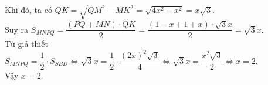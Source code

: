 \begin{ex}
{\begin{itemchoice}
\begin{center}
			\end{center}
			Khi đó, ta có $QK=\sqrt{Q{M^2}-M{K^2}}=\sqrt{4x^2-x^2}=x\sqrt  3 $.\\
			 Suy ra $S_{MNPQ}=\dfrac{\left(PQ+MN\right)\cdot QK}{2}=\dfrac{\left(1-x+1+x\right)\cdot\sqrt 3 x}{2}=\sqrt 3 x$.\\
			Từ giả thiết $S_{MNPQ}=\dfrac{1}{2}\cdot {S_{SBD}}\Leftrightarrow\sqrt  3 x=\dfrac{1}{2}\cdot \dfrac{\left(2x\right)^2\sqrt 3}{4}\Leftrightarrow\sqrt 3 x=\dfrac{x^2\sqrt 3}{2}\Leftrightarrow x=2$.\\
			Vậy  $x=2$.
		\end{itemchoice}
	 }
\end{ex}


